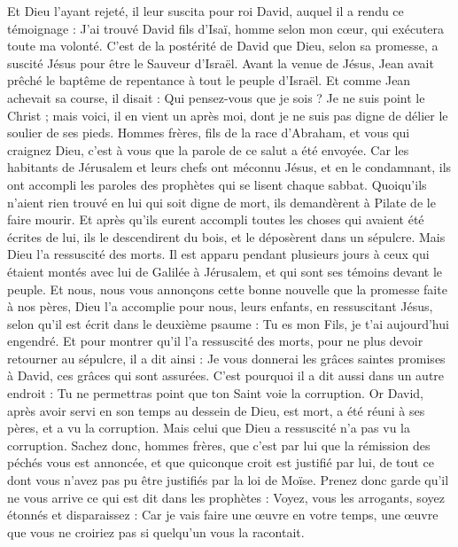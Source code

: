 \begin{multicols}{2}
Et Dieu l'ayant rejeté, il leur suscita pour roi David, auquel il a rendu ce témoignage : J'ai trouvé David fils d'Isaï, homme selon mon cœur, qui exécutera toute ma volonté.
C'est de la postérité de David que Dieu, selon sa promesse, a suscité Jésus pour être le Sauveur d'Israël.
Avant la venue de Jésus, Jean avait prêché le baptême de repentance à tout le peuple d'Israël.
Et comme Jean achevait sa course, il disait : Qui pensez-vous que je sois ? Je ne suis point le Christ ; mais voici, il en vient un après moi, dont je ne suis pas digne de délier le soulier de ses pieds.
Hommes frères, fils de la race d'Abraham, et vous qui craignez Dieu, c'est à vous que la parole de ce salut a été envoyée.
Car les habitants de Jérusalem et leurs chefs ont méconnu Jésus, et en le condamnant, ils ont accompli les paroles des prophètes qui se lisent chaque sabbat.
Quoiqu'ils n'aient rien trouvé en lui qui soit digne de mort, ils demandèrent à Pilate de le faire mourir.
Et après qu'ils eurent accompli toutes les choses qui avaient été écrites de lui, ils le descendirent du bois, et le déposèrent dans un sépulcre.
Mais Dieu l'a ressuscité des morts.
Il est apparu pendant plusieurs jours à ceux qui étaient montés avec lui de Galilée à Jérusalem, et qui sont ses témoins devant le peuple.
Et nous, nous vous annonçons cette bonne nouvelle que la promesse faite à nos pères,
Dieu l'a accomplie pour nous, leurs enfants, en ressuscitant Jésus, selon qu'il est écrit dans le deuxième psaume : Tu es mon Fils, je t'ai aujourd'hui engendré.
Et pour montrer qu'il l'a ressuscité des morts, pour ne plus devoir retourner au sépulcre, il a dit ainsi : Je vous donnerai les grâces saintes promises à David, ces grâces qui sont assurées.
C'est pourquoi il a dit aussi dans un autre endroit : Tu ne permettras point que ton Saint voie la corruption.
Or David, après avoir servi en son temps au dessein de Dieu, est mort, a été réuni à ses pères, et a vu la corruption.
Mais celui que Dieu a ressuscité n'a pas vu la corruption.
Sachez donc, hommes frères, que c'est par lui que la rémission des péchés vous est annoncée,
et que quiconque croit est justifié par lui, de tout ce dont vous n'avez pas pu être justifiés par la loi de Moïse.
Prenez donc garde qu'il ne vous arrive ce qui est dit dans les prophètes :
Voyez, vous les arrogants, soyez étonnés et disparaissez : Car je vais faire une œuvre en votre temps, une œuvre que vous ne croiriez pas si quelqu'un vous la racontait.

\end{multicols}
